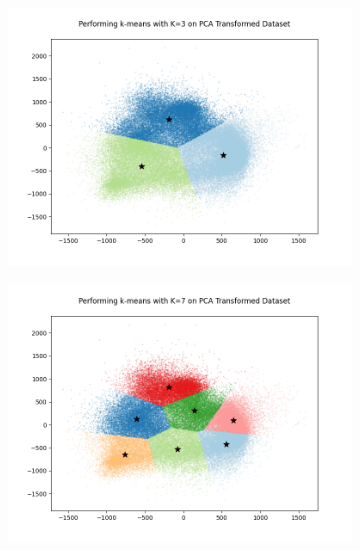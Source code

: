 \documentclass[12pt, a4paper]{article}
\begin{document}
\begin{figure}[h]
    \begin{subfigure}{0.32\linewidth}
        \includegraphics[width=\linewidth]{images/q4/d/3.png}
    \end{subfigure}
    \hfill
    \begin{subfigure}{0.32\linewidth}
        \includegraphics[width=\linewidth]{images/q4/d/7.png}
    \end{subfigure}
    \hfill
    \begin{subfigure}{0.32\linewidth}

\end{subfigure}
\end{figure}
\end{document}
